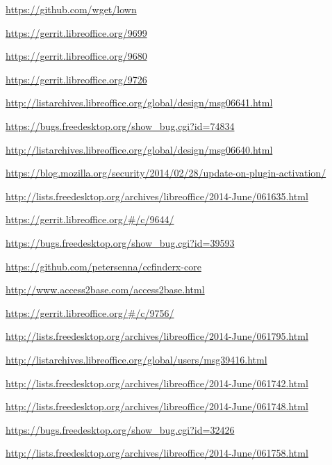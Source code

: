 \documentclass{article}
\begin{document}
\begin{thebibliography}{30}

\url{https://github.com/wget/lown}

\url{https://gerrit.libreoffice.org/9699}

\url{https://gerrit.libreoffice.org/9680}

\url{https://gerrit.libreoffice.org/9726}

\url{http://listarchives.libreoffice.org/global/design/msg06641.html}

\url{https://bugs.freedesktop.org/show_bug.cgi?id=74834}

\url{http://listarchives.libreoffice.org/global/design/msg06640.html}

\url{https://blog.mozilla.org/security/2014/02/28/update-on-plugin-activation/}

\url{http://lists.freedesktop.org/archives/libreoffice/2014-June/061635.html}

    \url{https://gerrit.libreoffice.org/#/c/9644/}

\url{https://bugs.freedesktop.org/show_bug.cgi?id=39593}

\url{https://github.com/petersenna/ccfinderx-core}

\url{http://www.access2base.com/access2base.html}

\url{https://gerrit.libreoffice.org/#/c/9756/}

\url{http://lists.freedesktop.org/archives/libreoffice/2014-June/061795.html}

\url{http://listarchives.libreoffice.org/global/users/msg39416.html}

\url{http://lists.freedesktop.org/archives/libreoffice/2014-June/061742.html}

\url{http://lists.freedesktop.org/archives/libreoffice/2014-June/061748.html}

\url{https://bugs.freedesktop.org/show_bug.cgi?id=32426}

\url{http://lists.freedesktop.org/archives/libreoffice/2014-June/061758.html}


\end{thebibliography}
\end{document}
